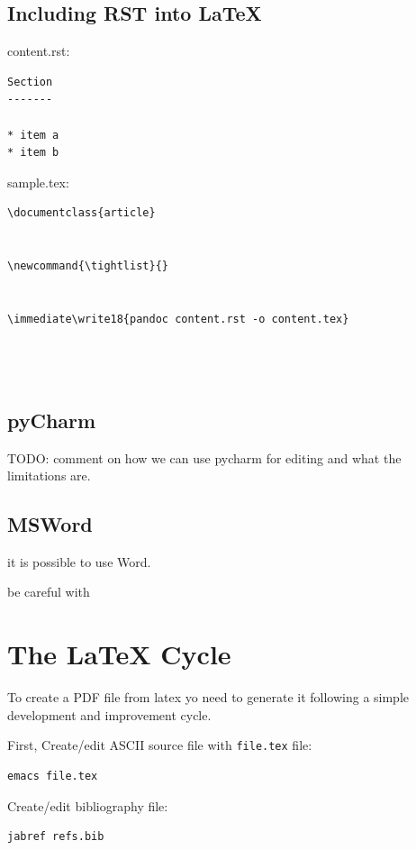 \subsection{Including RST into LaTeX}

content.rst:

\begin{verbatim}
Section
-------

* item a
* item b
\end{verbatim}

sample.tex:

\begin{verbatim}
\documentclass{article}


\newcommand{\tightlist}{}


\immediate\write18{pandoc content.rst -o content.tex}




\end{verbatim}


\subsection{pyCharm}

TODO: comment on how we can use pycharm for editing and what the
limitations are.

\subsection{MSWord}

it is possible to use Word.

be careful with 

\section{The LaTeX Cycle}\label{the-latex-cycle}

To create a PDF file from latex yo need to generate it following a
simple development and improvement cycle.

First, Create/edit ASCII source file with \texttt{file.tex} file:

\begin{verbatim}
emacs file.tex
\end{verbatim}

Create/edit bibliography file:

\begin{verbatim}
jabref refs.bib
\end{verbatim}

